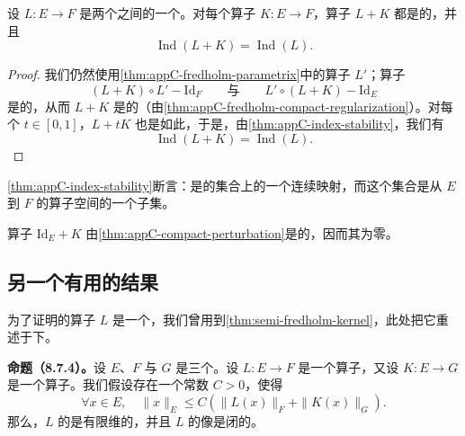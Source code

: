 \begin{theorem}\label{thm:appC-compact-perturbation-index}
设 $L : E \to F$ 是两个\trBanachSpace{}之间的一个\trFredholmOperator。对每个\trCompact{}算子 $K : E \to F$，算子 $L + K$ 都是\trFredholm{}的，并且
\[
\operatorname{Ind}(L + K) = \operatorname{Ind}(L).
\]
\end{theorem}

\begin{proof}
我们仍然使用\cref{thm:appC-fredholm-parametrix}中的算子 $L'$；算子
\[
(L + K) \circ L' - \mathrm{Id}_F \qquad\text{与}\qquad L' \circ (L + K) - \mathrm{Id}_E
\]
是\trCompact{}的，从而 $L + K$ 是\trFredholm{}的（由\cref{thm:appC-fredholm-compact-regularization}）。对每个 $t \in [0,1]$，$L + tK$ 也是如此，于是，由\cref{thm:appC-index-stability}，我们有
\[
\operatorname{Ind}(L + K) = \operatorname{Ind}(L).
\]
\end{proof}

\begin{remark}\label{thm:appC-index-continuity}
\cref{thm:appC-index-stability}断言：\trIndex{}是\trFredholmOperator{}的集合上的一个连续映射，而这个集合是从 $E$ 到 $F$ 的算子空间的一个\trOpen{}子集。
\end{remark}

\begin{remark}\label{thm:appC-id-plus-k-index-zero}
算子 $\mathrm{Id}_E + K$ 由\cref{thm:appC-compact-perturbation}是\trFredholm{}的，因而其\trIndex{}为零。
\end{remark}

\subsection{另一个有用的结果}
\label{subsec:appC-another-useful-result}

为了证明\trFloerEquation{}的\trLinearization{}算子 $L$ 是一个\trFredholmOperator，我们曾用到\cref{thm:semi-fredholm-kernel}，此处把它重述于下。

\noindent\textbf{命题（8.7.4）。}{\kaishu 设 $E$、$F$ 与 $G$ 是三个\trBanachSpace。设 $L : E \to F$ 是一个算子，又设 $K : E \to G$ 是一个\trCompact{}算子。我们假设存在一个常数 $C > 0$，使得
\[
\forall x \in E, \quad \|x\|_E \le C \left( \|L(x)\|_F + \|K(x)\|_G \right).
\]
那么，$L$ 的\trKernel{}是有限维的，并且 $L$ 的像是闭的。}

